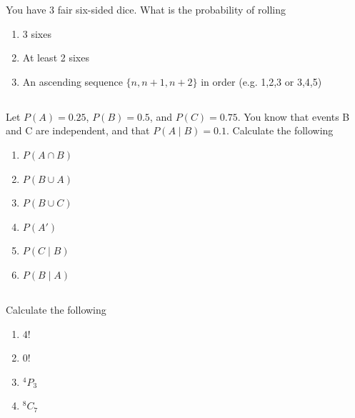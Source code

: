\documentclass[twocolumn]{article}
\newcommand\mrk[1]{}
\begin{document}
    You have 3 fair six-sided dice. What is the probability of rolling

    \begin{multicols}{2}
        \begin{enumerate}
            \item 3 sixes \mrk{1}
            \item At least 2 sixes \mrk{1}
        \end{enumerate}
    \end{multicols}
    \begin{enumerate}
        \setcounter{enumi}{2}
        \item An ascending sequence $\{ n, n+1, n+2 \}$ in order (e.g. 1,2,3 or 3,4,5) \mrk{1}
    \end{enumerate}


\subsection{}

    Let $P(A) = 0.25$, $P(B) = 0.5$, and $P(C) = 0.75$. You know that events B and C are independent, and that $P(A \mid B ) = 0.1 $. Calculate the following
    
    \begin{multicols}{2}
        \begin{enumerate}
            \item $P(A \cap B)$ \mrk{1}
            \item $P(B \cup A)$ \mrk{1}
            \item $P(B \cup C)$ \mrk{1}
            \item $P(A')$ \mrk{1}
            \item $P(C \mid B)$ \mrk{1}
            \item $P(B \mid A)$ \mrk{1}
        \end{enumerate}
    \end{multicols}

\subsection{}

    Calculate the following

    \begin{multicols}{2}
        \begin{enumerate}
            \item $ 4! $ \mrk{1}
            \item $ 0! $ \mrk{1}
            \item $ ^4P_3 $ \mrk{1}
            \item $ ^{8}C_{7} $ \mrk{1}
        \end{enumerate}
    \end{multicols}
\end{document}
